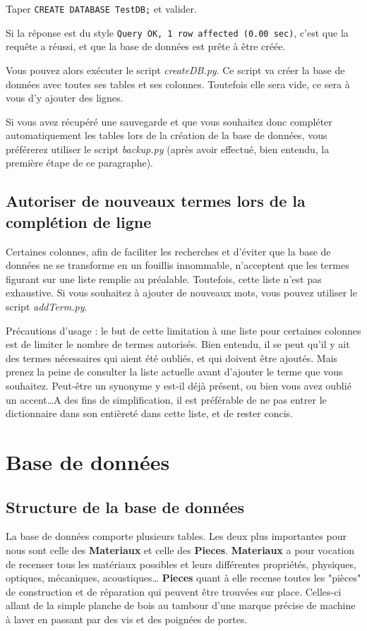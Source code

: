 \documentclass[12pt,a4paper]{article}
\begin{document}
    Taper \verb+CREATE DATABASE TestDB;+ et valider.
    
    Si la réponse est du style \verb+Query OK, 1 row affected (0.00 sec)+, c'est
    que la requête a réussi, et que la base de données est prête à être créée.
    
    Vous pouvez alors exécuter le script \emph{createDB.py}. Ce script va créer
    la base de données avec toutes ses tables et ses colonnes. Toutefois elle
    sera vide, ce sera à vous d'y ajouter des lignes.

    Si vous avez récupéré une sauvegarde et que vous souhaitez donc compléter
    automatiquement les tables lors de la création de la base de données, vous
    préférerez utiliser le script \emph{backup.py} (après avoir effectué, bien
    entendu, la première étape de ce paragraphe).


\subsection{Autoriser de nouveaux termes lors de la complétion de ligne}
    Certaines colonnes, afin de faciliter les recherches et d'éviter que la base
    de données ne se transforme en un fouillis innommable, n'acceptent que les termes
    figurant sur une liste remplie au préalable. Toutefois, cette liste n'est pas
    exhaustive. Si vous souhaitez à ajouter de nouveaux mots, vous pouvez utiliser
    le script \emph{addTerm.py}.
    
    Précautions d'usage : le but de cette limitation à une liste pour certaines colonnes
    est de limiter le nombre de termes autorisés. Bien entendu, il se peut qu'il y ait des
    termes nécessaires qui aient été oubliés, et qui doivent être ajoutés.
    Mais prenez la peine de consulter la liste actuelle avant d'ajouter le terme
    que vous souhaitez. Peut-être un synonyme y est-il déjà présent, ou bien vous avez
    oublié un accent\dots A des fins de simplification, il est préférable de ne pas entrer
    le dictionnaire dans son entièreté dans cette liste, et de rester concis.


\clearpage
\section{Base de données}

\bigskip
\subsection{Structure de la base de données}
    La base de données comporte plusieurs tables.
    Les deux plus importantes pour nous sont celle des \textbf{Materiaux} et celle des \textbf{Pieces}.
    \textbf{Materiaux} a pour vocation de recenser tous les matériaux possibles
    et leurs différentes propriétés, physiques, optiques, mécaniques, acoustiques\dots
    \textbf{Pieces} quant à elle recense toutes les "pièces" de construction et de réparation
    qui peuvent être trouvées sur place. Celles-ci allant de la simple planche de bois
    au tambour d'une marque précise de machine à laver en passant par des vis et des
    poignées de portes. 
\end{document}
